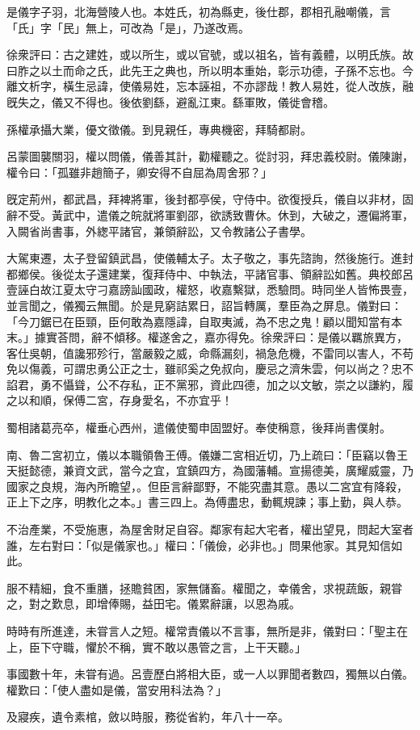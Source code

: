 
\begin{pinyinscope}
是儀字子羽，北海營陵人也。本姓氏，初為縣吏，後仕郡，郡相孔融嘲儀，言「氏」字「民」無上，可改為「是」，乃遂改焉。

徐衆評曰：古之建姓，或以所生，或以官號，或以祖名，皆有義體，以明氏族。故曰胙之以土而命之氏，此先王之典也，所以明本重始，彰示功德，子孫不忘也。今離文析字，橫生忌諱，使儀易姓，忘本誣祖，不亦謬哉！教人易姓，從人改族，融旣失之，儀又不得也。後依劉繇，避亂江東。繇軍敗，儀徙會稽。

孫權承攝大業，優文徵儀。到見親任，專典機密，拜騎都尉。

呂蒙圖襲關羽，權以問儀，儀善其計，勸權聽之。從討羽，拜忠義校尉。儀陳謝，權令曰：「孤雖非趙簡子，卿安得不自屈為周舍邪？」

旣定荊州，都武昌，拜裨將軍，後封都亭侯，守侍中。欲復授兵，儀自以非材，固辭不受。黃武中，遣儀之皖就將軍劉邵，欲誘致曹休。休到，大破之，遷偏將軍，入闕省尚書事，外緫平諸官，兼領辭訟，又令教諸公子書學。

大駕東遷，太子登留鎮武昌，使儀輔太子。太子敬之，事先諮詢，然後施行。進封都鄉侯。後從太子還建業，復拜侍中、中執法，平諸官事、領辭訟如舊。典校郎呂壹誣白故江夏太守刁嘉謗訕國政，權怒，收嘉繫獄，悉驗問。時同坐人皆怖畏壹，並言聞之，儀獨云無聞。於是見窮詰累日，詔旨轉厲，羣臣為之屏息。儀對曰：「今刀鋸已在臣頸，臣何敢為嘉隱諱，自取夷滅，為不忠之鬼！顧以聞知當有本末。」據實荅問，辭不傾移。權遂舍之，嘉亦得免。徐衆評曰：是儀以羈旅異方，客仕吳朝，值讒邪殄行，當嚴毅之威，命縣漏刻，禍急危機，不雷同以害人，不苟免以傷義，可謂忠勇公正之士，雖祁奚之免叔向，慶忌之濟朱雲，何以尚之？忠不諂君，勇不懾聳，公不存私，正不黨邪，資此四德，加之以文敏，崇之以謙約，履之以和順，保傅二宮，存身愛名，不亦宜乎！

蜀相諸葛亮卒，權垂心西州，遣儀使蜀申固盟好。奉使稱意，後拜尚書僕射。

南、魯二宮初立，儀以本職領魯王傅。儀嫌二宮相近切，乃上疏曰：「臣竊以魯王天挺懿德，兼資文武，當今之宜，宜鎮四方，為國藩輔。宣揚德美，廣耀威靈，乃國家之良規，海內所瞻望，。但臣言辭鄙野，不能究盡其意。愚以二宮宜有降殺，正上下之序，明教化之本。」書三四上。為傅盡忠，動輒規諫；事上勤，與人恭。

不治產業，不受施惠，為屋舍財足自容。鄰家有起大宅者，權出望見，問起大室者誰，左右對曰：「似是儀家也。」權曰：「儀儉，必非也。」問果他家。其見知信如此。

服不精細，食不重膳，拯贍貧困，家無儲畜。權聞之，幸儀舍，求視蔬飯，親甞之，對之歎息，即增俸賜，益田宅。儀累辭讓，以恩為戚。

時時有所進達，未甞言人之短。權常責儀以不言事，無所是非，儀對曰：「聖主在上，臣下守職，懼於不稱，實不敢以愚管之言，上干天聽。」

事國數十年，未甞有過。呂壹歷白將相大臣，或一人以罪聞者數四，獨無以白儀。權歎曰：「使人盡如是儀，當安用科法為？」

及寢疾，遺令素棺，斂以時服，務從省約，年八十一卒。


\end{pinyinscope}